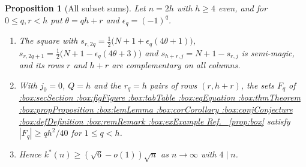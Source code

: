 \documentclass[11pt,a4paper]{article}
\makeatletter
\def\Cref@getprefix#1:#2\relax{#1}
\def\Cref@prefix@sec{sec}
\def\Cref@prefix@fig{fig}
\def\Cref@prefix@tab{tab}
\def\Cref@prefix@eq{eq}
\def\Cref@prefix@thm{thm}
\def\Cref@prefix@prop{prop}
\def\Cref@prefix@lem{lem}
\def\Cref@prefix@cor{cor}
\def\Cref@prefix@conj{conj}
\def\Cref@prefix@def{def}
\def\Cref@prefix@rem{rem}
\def\Cref@prefix@ex{ex}
\def\Cref@type@cap#1{%
  \edef\Cref@tmp{#1}%
  \ifx\Cref@tmp\Cref@prefix@sec Section%
  \else\ifx\Cref@tmp\Cref@prefix@fig Figure%
  \else\ifx\Cref@tmp\Cref@prefix@tab Table%
  \else\ifx\Cref@tmp\Cref@prefix@eq Equation%
  \else\ifx\Cref@tmp\Cref@prefix@thm Theorem%
  \else\ifx\Cref@tmp\Cref@prefix@prop Proposition%
  \else\ifx\Cref@tmp\Cref@prefix@lem Lemma%
  \else\ifx\Cref@tmp\Cref@prefix@cor Corollary%
  \else\ifx\Cref@tmp\Cref@prefix@conj Conjecture%
  \else\ifx\Cref@tmp\Cref@prefix@def Definition%
  \else\ifx\Cref@tmp\Cref@prefix@rem Remark%
  \else\ifx\Cref@tmp\Cref@prefix@ex Example%
  \else Ref.%
  \fi\fi\fi\fi\fi\fi\fi\fi\fi\fi\fi\fi
}
\DeclareRobustCommand{\Cref}[1]{%
  \begingroup
  \edef\Cref@label{#1}%
  \edef\Cref@prefix{\expandafter\Cref@getprefix\Cref@label:\relax}%
  \hyperref[#1]{\Cref@type@cap{\Cref@prefix}~\ref*{#1}}%
  \endgroup
}
\theoremstyle{plain}
\newtheorem{proposition}[theorem]{Proposition}
\theoremstyle{definition}
\theoremstyle{remark}
\makeatother
\begin{document}
\begin{proposition}[All subset sums]
\label{prop:subset}
Let $n=2h$ with $h\ge4$ even, and for $0\le q,r<h$ put $\theta=qh+r$ and $\epsilon_q=(-1)^q$.
\begin{enumerate}
\item[(i)] The square with $s_{r,2q}=\frac12\bigl(N+1+\epsilon_q(4\theta+1)\bigr)$, $s_{r,2q+1}=\frac12\bigl(N+1-\epsilon_q(4\theta+3)\bigr)$ and $s_{h+r,j}=N+1-s_{r,j}$ is semi-magic, and its rows $r$ and $h+r$ are complementary on all columns.
\item[(ii)] With $j_0=0$, $Q=h$ and the $r_q=h$ pairs of rows $(r,h+r)$, the sets $F_q$ of \Cref{prop:box} satisfy $|F_q|\ge qh^2/40$ for $1\le q<h$.
\item[(iii)] Hence $k^*(n)\ge(\sqrt6-o(1))\sqrt n$ as $n\to\infty$ with $4\mid n$.
\end{enumerate}
\end{proposition}
\end{document}
